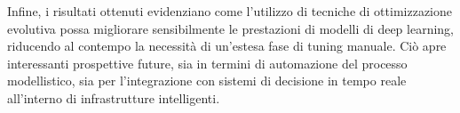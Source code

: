 \documentclass{article}
\begin{document}
Infine, i risultati ottenuti evidenziano come l’utilizzo di tecniche di ottimizzazione evolutiva possa 
migliorare sensibilmente le prestazioni di modelli di deep learning, riducendo al contempo la necessità 
di un’estesa fase di tuning manuale. Ciò apre interessanti prospettive future, sia in termini di 
automazione del processo modellistico, sia per l’integrazione con sistemi di decisione in tempo reale 
all’interno di infrastrutture intelligenti.



\end{document}
